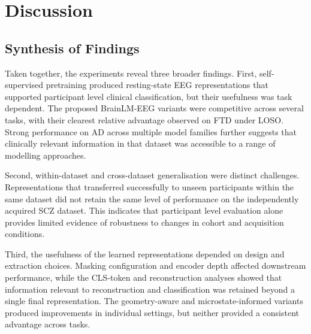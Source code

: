 %
%

\chapter{Discussion}\label{ch:discussion}

\section{Synthesis of Findings}\label{sec:d_synthesis}

Taken together, the experiments reveal three broader findings. First, self-supervised pretraining produced resting-state EEG representations that supported participant level clinical classification, but their usefulness was task dependent. The proposed BrainLM-EEG variants were competitive across several tasks, with their clearest relative advantage observed on FTD under LOSO. Strong performance on AD across multiple model families further suggests that clinically relevant information in that dataset was accessible to a range of modelling approaches.

Second, within-dataset and cross-dataset generalisation were distinct challenges. Representations that transferred successfully to unseen participants within the same dataset did not retain the same level of performance on the independently acquired SCZ dataset. This indicates that participant level evaluation alone provides limited evidence of robustness to changes in cohort and acquisition conditions.

Third, the usefulness of the learned representations depended on design and extraction choices. Masking configuration and encoder depth affected downstream performance, while the CLS-token and reconstruction analyses showed that information relevant to reconstruction and classification was retained beyond a single final representation. The geometry-aware and microstate-informed variants produced improvements in individual settings, but neither provided a consistent advantage across tasks.

